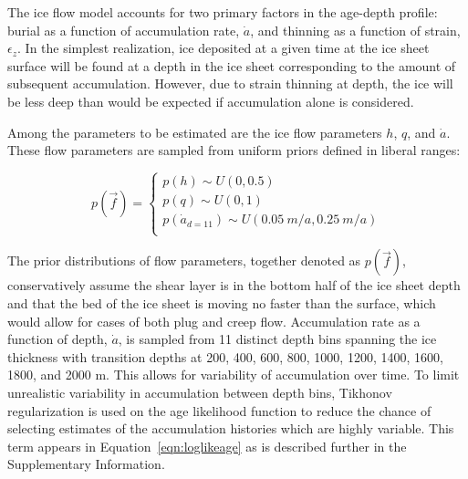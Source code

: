 The ice flow model accounts for two primary factors in the age-depth profile: burial as a function of accumulation rate, $\dot{a}$, and thinning as a function of strain, $\epsilon_z$. In the simplest realization, ice deposited at a given time at the ice sheet surface will be found at a depth in the ice sheet corresponding to the amount of subsequent accumulation. However, due to strain thinning at depth, the ice will be less deep than would be expected if accumulation alone is considered. 

Among the parameters to be estimated are the ice flow parameters $h$, $q$, and $\dot{a}$. These flow parameters are sampled from uniform priors defined in liberal ranges:

\begin{center}
\begin{equation}\label{priors}
p(\vec{f}) = 
\begin{cases}
p(h) \sim U(0, 0.5) \\
p(q) \sim U (0, 1) \\
p(\dot{a}_{d=11}) \sim U(0.05~m/a,0.25~m/a)\\
\end{cases}	
\end{equation}	
\end{center}

The prior distributions of flow parameters, together denoted as $p(\vec{f})$, conservatively assume the shear layer is in the bottom half of the ice sheet depth \citep{cuffey2010} and that the bed of the ice sheet is moving no faster than the surface, which would allow for cases of both plug and creep flow. Accumulation rate as a function of depth, $\dot{a}$, is sampled from 11 distinct depth bins spanning the ice thickness with transition depths at 200, 400, 600, 800, 1000, 1200, 1400, 1600, 1800, and 2000 m. This allows for variability of accumulation over time. To limit unrealistic variability in accumulation between depth bins, Tikhonov regularization is used on the age likelihood function to reduce the chance of selecting estimates of the accumulation histories which are highly variable. This term appears in Equation~\ref{eqn:loglikeage} as is described further in the Supplementary Information.
